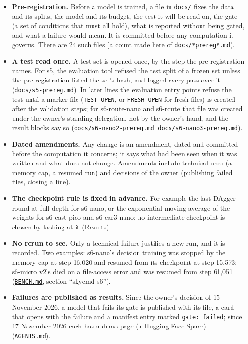 \documentclass[10pt]{article}
\begin{document}
\begin{itemize}
\item \textbf{Pre-registration.} Before a model is trained, a file in \texttt{docs/\allowbreak{}} fixes the data and its splits, the model and its budget, the test it will be read on, the gate (a set of conditions that must all hold), what is reported without being gated, and what a failure would mean. It is committed before any computation it governs. There are 24 such files (a count made here of \texttt{docs/\allowbreak{}*prereg*.md}).
\item \textbf{A test read once.} A test set is opened once, by the step the pre-registration names. For s5, the evaluation tool refused the test split of a frozen set unless the pre-registration listed the set's hash, and logged every pass over it (\href{https://github.com/maxgfr/skycmd/blob/main/docs/s5-prereg.md}{\texttt{docs/\allowbreak{}s5-prereg.md}}). In later lines the evaluation entry points refuse the test until a marker file (\texttt{TEST-OPEN}, or \texttt{FRESH-OPEN} for fresh files) is created after the validation steps; for s6-route-nano and s6-route that file was created under the owner's standing delegation, not by the owner's hand, and the result blocks say so (\href{https://github.com/maxgfr/skycmd/blob/main/docs/s6-nano2-prereg.md}{\texttt{docs/\allowbreak{}s6-nano2-prereg.md}}, \href{https://github.com/maxgfr/skycmd/blob/main/docs/s6-nano3-prereg.md}{\texttt{docs/\allowbreak{}s6-nano3-prereg.md}}).
\item \textbf{Dated amendments.} Any change is an amendment, dated and committed before the computation it concerns; it says what had been seen when it was written and what does not change. Amendments include technical ones (a memory cap, a resumed run) and decisions of the owner (publishing failed files, closing a line).
\item \textbf{The checkpoint rule is fixed in advance.} For example the last DAgger round at full depth for s6-nano, or the exponential moving average of the weights for s6-cast-pico and s6-ear3-nano; no intermediate checkpoint is chosen by looking at it (\href{https://maxgfr.github.io/skycmd/results/\#s6-november-2026}{Results}).
\item \textbf{No rerun to see.} Only a technical failure justifies a new run, and it is recorded. Two examples: s6-nano's decision training was stopped by the memory cap at step 16,020 and resumed from its checkpoint at step 15,573; s6-micro v2's died on a file-access error and was resumed from step 61,051 (\href{https://github.com/maxgfr/skycmd/blob/main/BENCH.md}{\texttt{BENCH.md}}, section ``skycmd-s6'').
\item \textbf{Failures are published as results.} Since the owner's decision of 15 November 2026, a model that fails its gate is published with its file, a card that opens with the failure and a manifest entry marked \texttt{gate: failed}; since 17 November 2026 each has a demo page (a Hugging Face Space) (\href{https://github.com/maxgfr/skycmd/blob/main/AGENTS.md}{\texttt{AGENTS.md}}).
\end{itemize}
\end{document}
